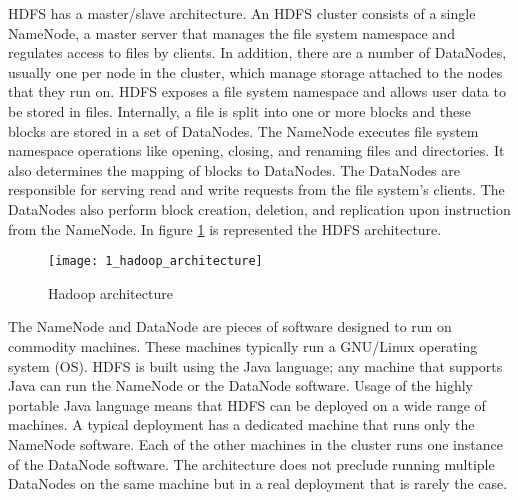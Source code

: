HDFS has a master/slave architecture. An HDFS cluster consists of a single NameNode, a master server that manages the file system namespace and regulates access to files by clients. In addition, there are a number of DataNodes, usually one per node in the cluster, which manage storage attached to the nodes that they run on. HDFS exposes a file system namespace and allows user data to be stored in files. Internally, a file is split into one or more blocks and these blocks are stored in a set of DataNodes. The NameNode executes file system namespace operations like opening, closing, and renaming files and directories. It also determines the mapping of blocks to DataNodes. The DataNodes are responsible for serving read and write requests from the file system’s clients. The DataNodes also perform block creation, deletion, and replication upon instruction from the NameNode. In figure \ref{hadoop_architecture} is represented the HDFS architecture.

\begin{figure}[!ht]
\centering
\texttt{[image: 1\_hadoop\_architecture]}
\caption{Hadoop architecture}\label{hadoop_architecture}
\end{figure}

The NameNode and DataNode are pieces of software designed to run on commodity machines. These machines typically run a GNU/Linux operating system (OS). HDFS is built using the Java language; any machine that supports Java can run the NameNode or the DataNode software. Usage of the highly portable Java language means that HDFS can be deployed on a wide range of machines. A typical deployment has a dedicated machine that runs only the NameNode software. Each of the other machines in the cluster runs one instance of the DataNode software. The architecture does not preclude running multiple DataNodes on the same machine but in a real deployment that is rarely the case.

